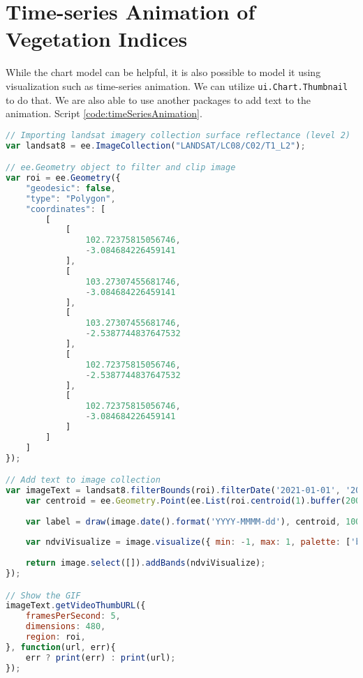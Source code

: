 \section{Time-series Animation of Vegetation Indices}
While the chart model can be helpful, it is also possible to model it using visualization such as time-series animation. We can utilize \verb|ui.Chart.Thumbnail| to do that. We are also able to use another packages to add text to the animation. Script \ref{code:timeSeriesAnimation}.

\begin{lstlisting}[language=JavaScript, label={code:timeSeriesAnimation}, caption={GEE Script for Time Series Animation}]
// Importing landsat imagery collection surface reflectance (level 2)
var landsat8 = ee.ImageCollection("LANDSAT/LC08/C02/T1_L2");

// ee.Geometry object to filter and clip image
var roi = ee.Geometry({
	"geodesic": false,
	"type": "Polygon",
	"coordinates": [
		[
			[
				102.72375815056746,
				-3.084684226459141
			],
			[
				103.27307455681746,
				-3.084684226459141
			],
			[
				103.27307455681746,
				-2.5387744837647532
			],
			[
				102.72375815056746,
				-2.5387744837647532
			],
			[
				102.72375815056746,
				-3.084684226459141
			]
		]
	]
});

// Add text to image collection
var imageText = landsat8.filterBounds(roi).filterDate('2021-01-01', '2021-12-31').map(function(image){
	var centroid = ee.Geometry.Point(ee.List(roi.centroid(1).buffer(20000).bounds().coordinates().get(0)).get(4));
	
	var label = draw(image.date().format('YYYY-MMMM-dd'), centroid, 100, { fontSize: 32 });
	
	var ndviVisualize = image.visualize({ min: -1, max: 1, palette: ['blue', 'white', 'green'] }).blend(label);
	
	return image.select([]).addBands(ndviVisualize);
});

// Show the GIF
imageText.getVideoThumbURL({
	framesPerSecond: 5,
	dimensions: 480,
	region: roi,
}, function(url, err){
	err ? print(err) : print(url);
});
\end{lstlisting}

\printbibliography